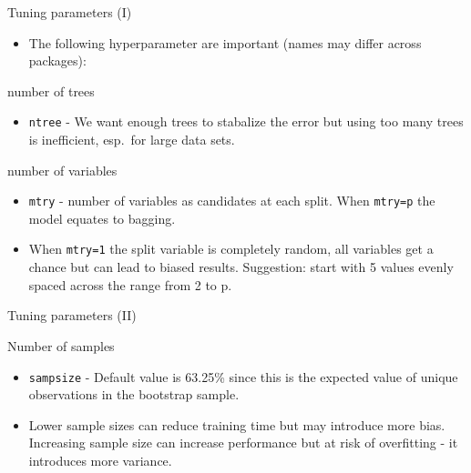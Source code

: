\documentclass[
  10pt,
  ignorenonframetext,
]{beamer}
\providecommand{\tightlist}{%
  \setlength{\itemsep}{0pt}\setlength{\parskip}{0pt}}
\begin{document}
\begin{frame}[fragile]{Tuning parameters (I)}
\protect\hypertarget{tuning-parameters-i}{}

\begin{itemize}
\tightlist
\item
  The following hyperparameter are important (names may differ across
  packages):
\end{itemize}

\begin{block}{number of trees}

\begin{itemize}
\tightlist
\item
  \texttt{ntree} - We want enough trees to stabalize the error but using
  too many trees is inefficient, esp.~for large data sets.
\end{itemize}

\end{block}

\begin{block}{number of variables}

\begin{itemize}
\tightlist
\item
  \texttt{mtry} - number of variables as candidates at each split. When
  \texttt{mtry=p} the model equates to bagging.
\item
  When \texttt{mtry=1} the split variable is completely random, all
  variables get a chance but can lead to biased results. Suggestion:
  start with 5 values evenly spaced across the range from 2 to p.
\end{itemize}

\end{block}

\end{frame}

\begin{frame}[fragile]{Tuning parameters (II)}
\protect\hypertarget{tuning-parameters-ii}{}

\begin{block}{Number of samples}

\begin{itemize}
\tightlist
\item
  \texttt{sampsize} - Default value is 63.25\% since this is the
  expected value of unique observations in the bootstrap sample.
\item
  Lower sample sizes can reduce training time but may introduce more
  bias. Increasing sample size can increase performance but at risk of
  overfitting - it introduces more variance. 
\end{itemize}

\end{block}

\end{frame}
\end{document}
